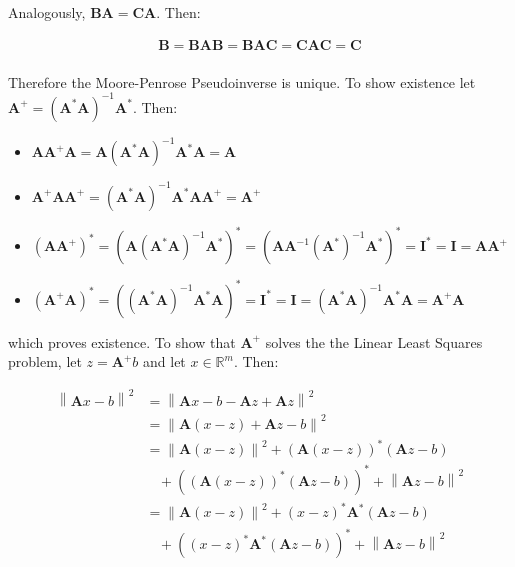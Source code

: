 \documentclass{article}
\newcommand{\norm}[1]{\left\lVert#1\right\rVert}
\begin{document}
Analogously, $\mathbf{B} \mathbf{A} = \mathbf{C} \mathbf{A}$. Then:

\begin{gather*}
\mathbf{B} = \mathbf{B} \mathbf{A} \mathbf{B} = \mathbf{B} \mathbf{A} \mathbf{C} = \mathbf{C} \mathbf{A} \mathbf{C} = \mathbf{C} \\
\end{gather*}

Therefore the Moore-Penrose Pseudoinverse is unique. To show existence let $\mathbf{A}^+ = (\mathbf{A}^* \mathbf{A})^{-1} \mathbf{A}^*$. Then:

\begin{itemize}
\item $\mathbf{A} \mathbf{A}^+ \mathbf{A} = \mathbf{A} (\mathbf{A}^* \mathbf{A})^{-1} \mathbf{A}^* \mathbf{A} = \mathbf{A}$
\item $\mathbf{A}^+ \mathbf{A} \mathbf{A}^+ = (\mathbf{A}^* \mathbf{A})^{-1} \mathbf{A}^* \mathbf{A} \mathbf{A}^+ = \mathbf{A}^+$
\item $(\mathbf{A} \mathbf{A}^+)^* = (\mathbf{A} (\mathbf{A}^* \mathbf{A})^{-1} \mathbf{A}^*)^* = (\mathbf{A} \mathbf{A}^{-1} (\mathbf{A}^*)^{-1} \mathbf{A}^*)^* = \mathbf{I}^* = \mathbf{I} = \mathbf{A} \mathbf{A}^+$
\item $(\mathbf{A}^+ \mathbf{A})^* = ((\mathbf{A}^* \mathbf{A})^{-1} \mathbf{A}^* \mathbf{A})^* = \mathbf{I}^* = \mathbf{I} = (\mathbf{A}^* \mathbf{A})^{-1} \mathbf{A}^* \mathbf{A} = \mathbf{A}^+ \mathbf{A}$
\end{itemize}

which proves existence. To show that $\mathbf{A}^+$ solves the the Linear Least Squares problem, let $z = \mathbf{A}^+ b$ and let $x \in \mathbb{R}^m$. Then:

\begin{align*}
\norm{\mathbf{A} x - b}^2 &= \norm{\mathbf{A} x - b - \mathbf{A} z + \mathbf{A} z}^2 \\
&= \norm{\mathbf{A} (x - z) + \mathbf{A} z - b}^2 \\
&= \norm{\mathbf{A} (x - z)}^2 + (\mathbf{A} (x - z))^* (\mathbf{A} z - b) \\
&\: \: \: \:+ ((\mathbf{A} (x - z))^* (\mathbf{A} z - b))^* + \norm{\mathbf{A} z - b}^2 \\
&= \norm{\mathbf{A} (x - z)}^2 + (x - z)^* \mathbf{A}^* (\mathbf{A} z - b) \\
&\: \: \: \:+ ((x - z)^* \mathbf{A}^* (\mathbf{A} z - b))^* + \norm{\mathbf{A} z - b}^2 \\
\end{align*}
\end{document}
